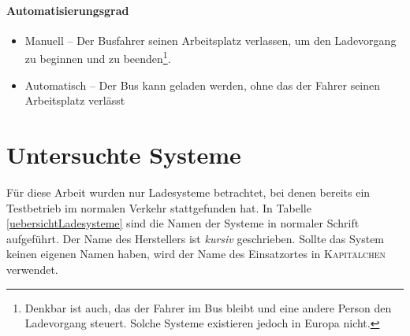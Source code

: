 \paragraph{Automatisierungsgrad}
\begin{itemize}
	\item Manuell – Der Busfahrer seinen Arbeitsplatz verlassen, um den Ladevorgang zu beginnen und zu beenden\footnote{Denkbar ist auch, das der Fahrer im Bus bleibt und eine andere Person den Ladevorgang steuert. Solche Systeme existieren jedoch in Europa nicht.}.
	\item Automatisch – Der Bus kann geladen werden, ohne das der Fahrer seinen Arbeitsplatz verlässt
\end{itemize}

\section{Untersuchte Systeme}
Für diese Arbeit wurden nur Ladesysteme betrachtet, bei denen bereits ein Testbetrieb im normalen Verkehr stattgefunden hat. In Tabelle \ref{uebersichtLadesysteme} sind die Namen der Systeme in normaler Schrift aufgeführt. Der Name des Herstellers ist \emph{kursiv} geschrieben. Sollte das System keinen eigenen Namen haben, wird der Name des Einsatzortes in \textsc{Kapitälchen} verwendet.
